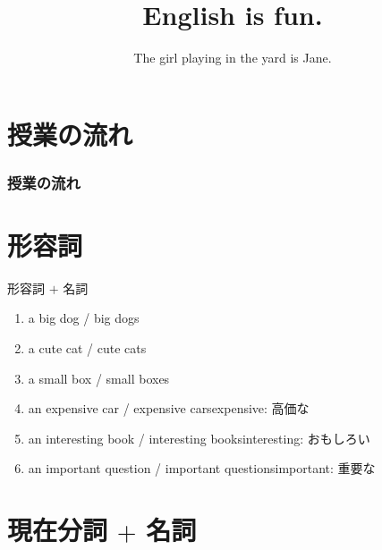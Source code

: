 \documentclass[aspectratio=169,xcolor={dvipsnames,table}]{beamer}
\title{English is fun.}
\subtitle{The girl playing in the yard is Jane.}
\author{}
\institute[]{}
\date[]
\begin{document}
\begin{frame}[plain]
  \titlepage
\end{frame}

\section*{授業の流れ}
\begin{frame}[plain]
  \frametitle{授業の流れ}
  \tableofcontents
\end{frame}

\section{形容詞}
 \begin{frame}[plain]{形容詞 $+$ 名詞}
 \begin{enumerate}
  \item a big dog / big dogs
  \item a cute cat / cute cats
  \item a small box / small boxes
  \item an expensive car / expensive cars\hfill{\scriptsize expensive: 高価な}
  \item an interesting book / interesting books\hfill{\scriptsize interesting: おもしろい}
  \item an important question / important questions\hfill{\scriptsize important: 重要な}
 \end{enumerate}

\mbox{}\hfill{\scriptsize {}}
 \end{frame}
\section{現在分詞 $+$ 名詞}
\end{document}
